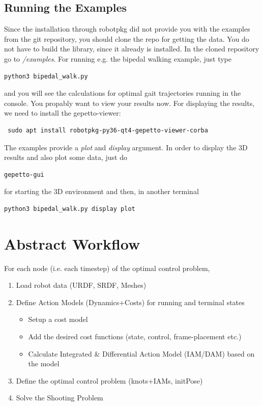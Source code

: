 \subsection{Running the Examples}
Since the installation through robotpkg did not provide you with the examples from the git repository, you should clone the repo \cite{crocoddylweb} for getting the data. You do not have to build the library, since it already is installed. 
In the cloned repository go to \textit{/examples}. For running e.g. the bipedal walking example, just type
\begin{verbatim}
python3 bipedal_walk.py
\end{verbatim}
and you will see the calculations for optimal gait trajectories running in the console. 
You propably want to view your results now. For displaying the results, we need to install the gepetto-viewer:
\begin{verbatim}
 sudo apt install robotpkg-py36-qt4-gepetto-viewer-corba
\end{verbatim}
The examples provide a \textit{plot} and \textit{display} argument. In order to display the 3D results and also plot some data, just do 
\begin{verbatim}
gepetto-gui
\end{verbatim}
for starting the 3D environment and then, in another terminal
\begin{verbatim}
python3 bipedal_walk.py display plot
\end{verbatim}



\section{Abstract Workflow}
For each node (i.e. each timestep) of the optimal control problem, 
\begin{enumerate}
\item Load robot data (URDF, SRDF, Meshes)
\item Define Action Models (Dynamics+Costs) for running and terminal states 
	\begin{itemize}
	\item Setup a cost model
	\item Add the desired cost functions (state, control, frame-placement etc.)
	\item Calculate Integrated \& Differential Action Model (IAM/DAM) based on the model
	\end{itemize}
\item Define the optimal control problem (knots+IAMs, initPose)
\item Solve the Shooting Problem
\end{enumerate}



